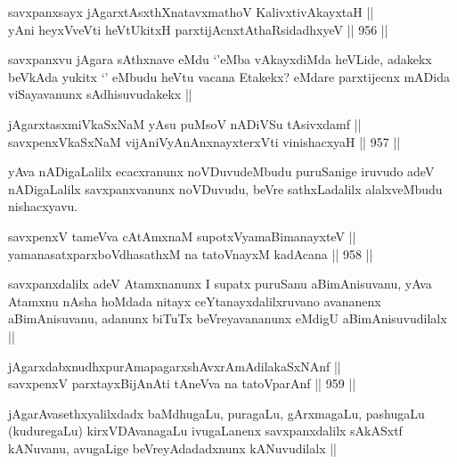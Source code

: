 
\begin{shl}
savxpanxsayx jAgarxtAsxthXnatavxmathoV KalivxtivAkayxtaH || \\
yAni heyxVveVti heVtUkitxH parxtijAcnxtAthaRsidadhxyeV ||  956 ||  
\end{shl}

\begin{artha}
savxpanxvu jAgara sAthxnave eMdu `\stext'eMba vAkayxdiMda heVLide, adakekx beVkAda yukitx `\stext' eMbudu heVtu vacana Etakekx? eMdare parxtijecnx mADida viSayavanunx sAdhisuvudakekx ||
\end{artha}


\begin{shl}
jAgarxtasxmiVkaSxNaM yAsu puMsoV nADiVSu tAsivxdamf || \\
savxpenxVkaSxNaM vijAniVyAnAnxnayxterxVti vinishacxyaH ||  957 ||  
\end{shl}

\begin{artha}
yAva nADigaLalilx ecacxranunx noVDuvudeMbudu puruSanige iruvudo adeV nADigaLalilx savxpanxvanunx noVDuvudu, beVre sathxLadalilx alalxveMbudu nishacxyavu.
\end{artha}


\begin{shl}
savxpenxV tameVva cA\s \s tAmxnaM supotxV\s yamaBimanayxteV || \\
yamanasatxparxboVdhasathxM na tatoV\s nayxM kadAcana ||  958 ||  
\end{shl}

\begin{artha}
savxpanxdalilx adeV Atamxnanunx I supatx puruSanu aBimAnisuvanu, yAva Atamxnu nAsha hoMdada nitayx ceYtanayxdalilxruvano avananenx aBimAnisuvanu, adanunx biTuTx beVreyavananunx eMdigU aBimAnisuvudilalx ||
\end{artha}


\begin{shl}
jAgarxdabxnudhxpurAmapagarxshAvxrAmAdilakaSxNAnf || \\
savxpenxV parxtayxBijAnAti tAneVva na tatoV\s parAnf ||  959 ||  
\end{shl}

\begin{artha}
jAgarAvasethxyalilxdadx baMdhugaLu, puragaLu, gArxmagaLu, pashugaLu (kuduregaLu) kirxVDAvanagaLu ivugaLanenx savxpanxdalilx sAkASxtf kANuvanu, avugaLige beVreyAdadadxnunx kANuvudilalx ||
\end{artha}

